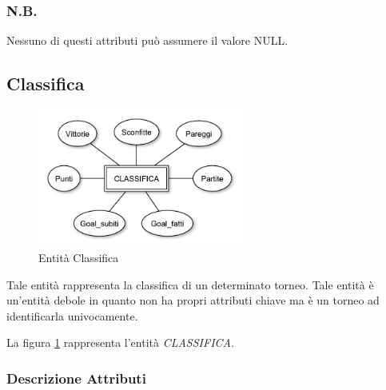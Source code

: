 		\subsubsection*{N.B.}
		Nessuno di questi attributi può assumere il valore NULL.
	
	\subsection{Classifica}
	
		\begin{figure}[h]
			\centering
			\includegraphics[width=0.6\textwidth]
			{immagini/10-classifica}
			
			\caption{Entità Classifica}
			\label{entita-classifica}
		\end{figure}
		
		Tale entità rappresenta la classifica di un determinato torneo. Tale entità è un'entità debole in quanto non ha propri attributi chiave ma è un torneo ad identificarla univocamente.
		
		La figura \ref{entita-classifica} rappresenta l'entità \emph{CLASSIFICA}.
		
		\subsubsection*{Descrizione Attributi}
		
